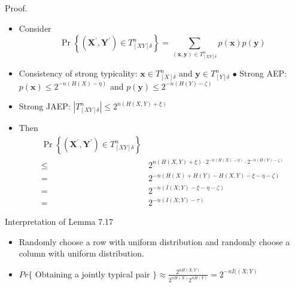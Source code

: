 \documentclass[8pt]{article}
\begin{document}
\noindent Proof.
\begin{itemize}
	\item Consider
	$$
	\operatorname{Pr}\left\{\left(\mathbf{X}^{\prime}, \mathbf{Y}^{\prime}\right) \in T_{[X Y] \delta}^{n}\right\}=\sum_{(\mathbf{x}, \mathbf{y}) \in T_{[X Y] \delta}^{n}} p(\mathbf{x}) p(\mathbf{y})
	$$
	\item Consistency of strong typicality: $\mathbf{x} \in T_{[X] \delta}^{n}$ and $\mathbf{y} \in T_{[Y] \delta}^{n}$
	$\bullet$ Strong AEP: $p(\mathbf{x}) \leq 2^{-n(H(X)-\eta)}$ and $p(\mathbf{y}) \leq 2^{-n(H(Y)-\zeta)}$
	\item Strong JAEP: $\left|T_{[X Y] \delta}^{n}\right| \leq 2^{n(H(X, Y)+\xi)}$
	\item Then
	$$
	\begin{aligned}
	\operatorname{Pr}\left\{\left(\mathbf{X}^{\prime}, \mathbf{Y}^{\prime}\right) \in T_{[X Y] \delta}^{n}\right\} \\
	\leq & 2^{n(H(X, Y)+\xi) \cdot 2^{-n(H(X)-\eta)} \cdot 2^{-n(H(Y)-\zeta)}} \\
	=& 2^{-n(H(X)+H(Y)-H(X, Y)-\xi-\eta-\zeta)} \\
	=& 2^{-n(I(X ; Y)-\xi-\eta-\zeta)} \\
	=& 2^{-n(I(X ; Y)-\tau)}
	\end{aligned}
	$$
\end{itemize}
Interpretation of Lemma 7.17
\begin{itemize}
	\item Randomly choose a row with uniform distribution and randomly choose a column with uniform distribution.
	\item $Pr\{$ Obtaining a jointly typical pair $\} \approx \frac{2^{n H(X, Y)}}{2^{n H(X)} 2^{n H(Y)}}=2^{-n I((X ; Y)}$
\end{itemize}
\end{document}
